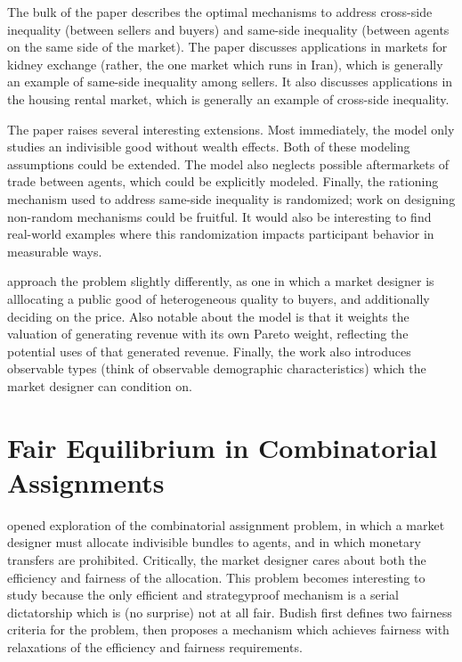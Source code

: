 \documentclass[JEL]{AEA}
\begin{document}
The bulk of the paper describes the optimal mechanisms to address cross-side inequality (between sellers and buyers) and same-side inequality (between agents on the same side of the market). The paper discusses applications in markets for kidney exchange (rather, the one market which runs in Iran), which is generally an example of same-side inequality among sellers. It also discusses applications in the housing rental market, which is generally an example of cross-side inequality.


The paper raises several interesting extensions. Most immediately, the model only studies an indivisible good without wealth effects. Both of these modeling assumptions could be extended. The model also neglects possible aftermarkets of trade between agents, which could be explicitly modeled. Finally, the rationing mechanism used to address same-side inequality is randomized; work on designing non-random mechanisms could be fruitful. It would also be interesting to find real-world examples where this randomization impacts participant behavior in measurable ways.



\cite{akbarpour-2020} approach the problem slightly differently, as one in which a market designer is alllocating a public good of heterogeneous quality to buyers, and additionally deciding on the price. Also notable about the \cite{akbarpour-2020} model is that it weights the valuation of generating revenue with its own Pareto weight, reflecting the potential uses of that generated revenue. Finally, the work also introduces observable types (think of observable demographic characteristics) which the market designer can condition on.


\section{Fair Equilibrium in Combinatorial Assignments}

\cite{budish-2011} opened exploration of the combinatorial assignment problem, in which a market designer must allocate indivisible bundles to agents, and in which monetary transfers are prohibited. Critically, the market designer cares about both the efficiency and fairness of the allocation. This problem becomes interesting to study because the only efficient and strategyproof mechanism is a serial dictatorship which is (no surprise) not at all fair. Budish first defines two fairness criteria for the problem, then proposes a mechanism which achieves fairness with relaxations of the efficiency and fairness requirements.
\end{document}
